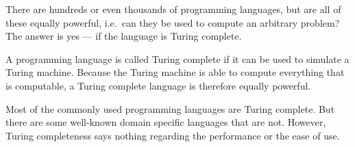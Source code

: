 
There are hundreds or even thousands of programming languages, but are all of these equally powerful, i.e.~can they be used to compute an arbitrary problem? The answer is yes --- if the language is Turing complete.

A programming language is called Turing complete if it can be used to simulate a Turing machine. Because the Turing machine is able to compute everything that is computable, a Turing complete language is therefore equally powerful.

Most of the commonly used programming languages are Turing complete. But there are some well-known domain specific languages that are not. However, Turing completeness says nothing regarding the performance or the ease of use.

